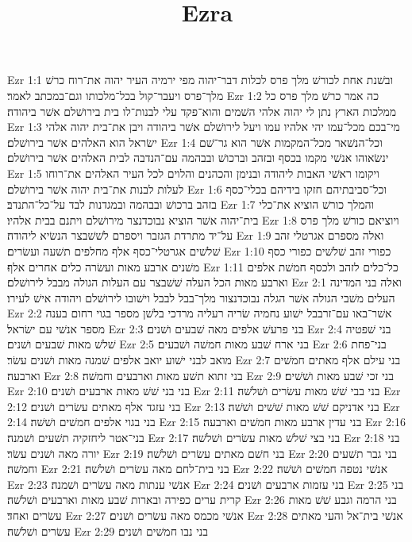 

\title{Ezra}

Ezr 1:1  ובשׁנת אחת לכורשׁ מלך פרס לכלות דבר־יהוה מפי ירמיה העיר יהוה את־רוח כרשׁ מלך־פרס ויעבר־קול בכל־מלכותו וגם־במכתב לאמר׃
Ezr 1:2  כה אמר כרשׁ מלך פרס כל ממלכות הארץ נתן לי יהוה אלהי השׁמים והוא־פקד עלי לבנות־לו בית בירושׁלם אשׁר ביהודה׃
Ezr 1:3  מי־בכם מכל־עמו יהי אלהיו עמו ויעל לירושׁלם אשׁר ביהודה ויבן את־בית יהוה אלהי ישׂראל הוא האלהים אשׁר בירושׁלם׃
Ezr 1:4  וכל־הנשׁאר מכל־המקמות אשׁר הוא גר־שׁם ינשׂאוהו אנשׁי מקמו בכסף ובזהב וברכושׁ ובבהמה עם־הנדבה לבית האלהים אשׁר בירושׁלם׃
Ezr 1:5  ויקומו ראשׁי האבות ליהודה ובנימן והכהנים והלוים לכל העיר האלהים את־רוחו לעלות לבנות את־בית יהוה אשׁר בירושׁלם׃
Ezr 1:6  וכל־סביבתיהם חזקו בידיהם בכלי־כסף בזהב ברכושׁ ובבהמה ובמגדנות לבד על־כל־התנדב׃
Ezr 1:7  והמלך כורשׁ הוציא את־כלי בית־יהוה אשׁר הוציא נבוכדנצר מירושׁלם ויתנם בבית אלהיו׃
Ezr 1:8  ויוציאם כורשׁ מלך פרס על־יד מתרדת הגזבר ויספרם לשׁשׁבצר הנשׂיא ליהודה׃
Ezr 1:9  ואלה מספרם אגרטלי זהב שׁלשׁים אגרטלי־כסף אלף מחלפים תשׁעה ועשׂרים׃
Ezr 1:10  כפורי זהב שׁלשׁים כפורי כסף משׁנים ארבע מאות ועשׂרה כלים אחרים אלף׃
Ezr 1:11  כל־כלים לזהב ולכסף חמשׁת אלפים וארבע מאות הכל העלה שׁשׁבצר עם העלות הגולה מבבל לירושׁלם׃
Ezr 2:1  ואלה בני המדינה העלים משׁבי הגולה אשׁר הגלה נבוכדנצור מלך־בבל לבבל וישׁובו לירושׁלם ויהודה אישׁ לעירו׃
Ezr 2:2  אשׁר־באו עם־זרבבל ישׁוע נחמיה שׂריה רעליה מרדכי בלשׁן מספר בגוי רחום בענה מספר אנשׁי עם ישׂראל׃
Ezr 2:3  בני פרעשׁ אלפים מאה שׁבעים ושׁנים׃
Ezr 2:4  בני שׁפטיה שׁלשׁ מאות שׁבעים ושׁנים׃
Ezr 2:5  בני ארח שׁבע מאות חמשׁה ושׁבעים׃
Ezr 2:6  בני־פחת מואב לבני ישׁוע יואב אלפים שׁמנה מאות ושׁנים עשׂר׃
Ezr 2:7  בני עילם אלף מאתים חמשׁים וארבעה׃
Ezr 2:8  בני זתוא תשׁע מאות וארבעים וחמשׁה׃
Ezr 2:9  בני זכי שׁבע מאות ושׁשׁים׃
Ezr 2:10  בני בני שׁשׁ מאות ארבעים ושׁנים׃
Ezr 2:11  בני בבי שׁשׁ מאות עשׂרים ושׁלשׁה׃
Ezr 2:12  בני עזגד אלף מאתים עשׂרים ושׁנים׃
Ezr 2:13  בני אדניקם שׁשׁ מאות שׁשׁים ושׁשׁה׃
Ezr 2:14  בני בגוי אלפים חמשׁים ושׁשׁה׃
Ezr 2:15  בני עדין ארבע מאות חמשׁים וארבעה׃
Ezr 2:16  בני־אטר ליחזקיה תשׁעים ושׁמנה׃
Ezr 2:17  בני בצי שׁלשׁ מאות עשׂרים ושׁלשׁה׃
Ezr 2:18  בני יורה מאה ושׁנים עשׂר׃
Ezr 2:19  בני חשׁם מאתים עשׂרים ושׁלשׁה׃
Ezr 2:20  בני גבר תשׁעים וחמשׁה׃
Ezr 2:21  בני בית־לחם מאה עשׂרים ושׁלשׁה׃
Ezr 2:22  אנשׁי נטפה חמשׁים ושׁשׁה׃
Ezr 2:23  אנשׁי ענתות מאה עשׂרים ושׁמנה׃
Ezr 2:24  בני עזמות ארבעים ושׁנים׃
Ezr 2:25  בני קרית ערים כפירה ובארות שׁבע מאות וארבעים ושׁלשׁה׃
Ezr 2:26  בני הרמה וגבע שׁשׁ מאות עשׂרים ואחד׃
Ezr 2:27  אנשׁי מכמס מאה עשׂרים ושׁנים׃
Ezr 2:28  אנשׁי בית־אל והעי מאתים עשׂרים ושׁלשׁה׃
Ezr 2:29  בני נבו חמשׁים ושׁנים׃

